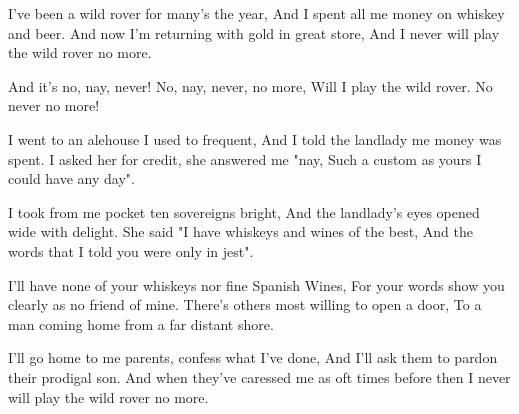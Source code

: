 \beginverse
I've been a wild rover for many's the year,
And I spent all me money on whiskey and beer.
And now I'm returning with gold in great store,
And I never will play the wild rover no more.
\endverse

\beginchorus
And it's no, nay, never!
No, nay, never, no more,
Will I play the wild rover.
No never no more!
\endchorus

\beginverse
I went to an alehouse I used to frequent,
And I told the landlady me money was spent.
I asked her for credit, she answered me "nay,
Such a custom as yours I could have any day".
\endverse

\beginverse
I took from me pocket ten sovereigns bright,
And the landlady's eyes opened wide with delight.
She said "I have whiskeys and wines of the best,
And the words that I told you were only in jest".
\endverse

\beginverse
I'll have none of your whiskeys nor fine Spanish Wines,
For your words show you clearly as no friend of mine.
There's others most willing to open a door,
To a man coming home from a far distant shore.
\endverse

\beginverse
I'll go home to me parents, confess what I've done,
And I'll ask them to pardon their prodigal son.
And when they've caressed me as oft times before
then I never will play the wild rover no more.
\endverse

\endsong